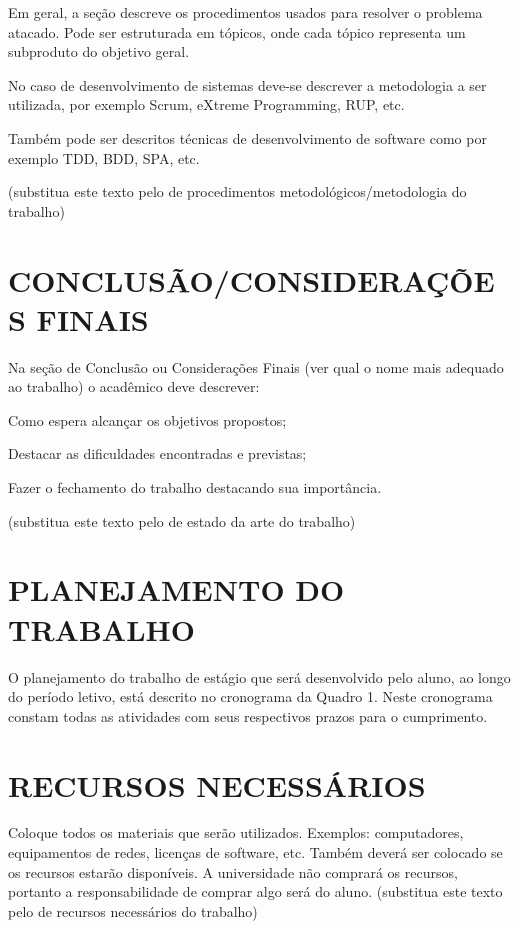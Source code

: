 Em geral, a seção descreve os procedimentos usados para resolver o problema atacado. Pode ser estruturada em tópicos, onde cada tópico representa um subproduto do objetivo geral.

No caso de desenvolvimento de sistemas deve-se descrever a metodologia a ser utilizada, por exemplo Scrum, eXtreme Programming, RUP, etc. 

Também pode ser descritos técnicas de desenvolvimento de software como por exemplo TDD, BDD, SPA,  etc.

(substitua este texto pelo de procedimentos metodológicos/metodologia do trabalho)

\section{CONCLUSÃO/CONSIDERAÇÕES FINAIS} %
\label{sec:conclusao}
Na seção de Conclusão ou Considerações Finais (ver qual o nome mais adequado ao trabalho) o acadêmico deve descrever:

Como espera alcançar os objetivos propostos;

Destacar as dificuldades encontradas e previstas;

Fazer o fechamento do trabalho destacando sua importância.

(substitua este texto pelo de estado da arte do trabalho)

\section{PLANEJAMENTO DO TRABALHO}
\label{sec:planejamento}
O planejamento do trabalho de estágio que será desenvolvido pelo aluno, ao longo do período letivo, está descrito no cronograma da Quadro 1. Neste cronograma constam todas as atividades com seus respectivos prazos para o cumprimento.


\section{RECURSOS NECESSÁRIOS}
\label{sec:recursos}
Coloque todos os materiais que serão utilizados. Exemplos: computadores, equipamentos de redes, licenças de software, etc. Também deverá ser colocado se os recursos estarão disponíveis. A universidade não comprará os recursos, portanto a responsabilidade de comprar algo será do aluno. (substitua este texto pelo de recursos necessários do trabalho)

